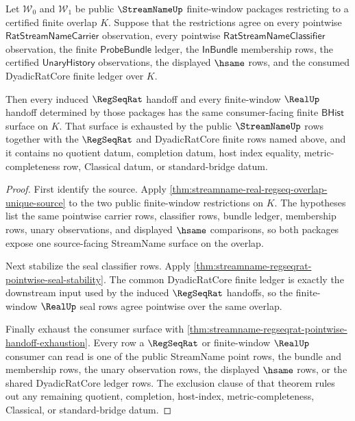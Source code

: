 \begin{theorem}
\label{thm:streamname-real-regseq-common-window-consumer-determinacy}
Let $\mathcal{W}_0$ and $\mathcal{W}_1$ be public $\StreamNameUp$
finite-window packages restricting to a certified finite overlap $K$. Suppose
that the restrictions agree on every pointwise $\mathsf{RatStreamNameCarrier}$
observation, every pointwise $\mathsf{RatStreamNameClassifier}$ observation,
the finite $\mathsf{ProbeBundle}$ ledger, the $\mathsf{InBundle}$ membership
rows, the certified $\mathsf{UnaryHistory}$ observations, the displayed
$\hsame$ rows, and the consumed DyadicRatCore finite ledger over $K$.

Then every induced $\RegSeqRat$ handoff and every finite-window $\RealUp$
handoff determined by those packages has the same consumer-facing finite
$\mathsf{BHist}$ surface on $K$. That surface is exhausted by the public
$\StreamNameUp$ rows together with the $\RegSeqRat$ and DyadicRatCore finite
rows named above, and it contains no quotient datum, completion datum, host
index equality, metric-completeness row, Classical datum, or standard-bridge
datum.
\end{theorem}
\begin{proof}
First identify the source. Apply
\autoref{thm:streamname-real-regseq-overlap-unique-source} to the two public
finite-window restrictions on $K$. The hypotheses list the same pointwise
carrier rows, classifier rows, bundle ledger, membership rows, unary
observations, and displayed $\hsame$ comparisons, so both packages expose one
source-facing StreamName surface on the overlap.

Next stabilize the seal classifier rows. Apply
\autoref{thm:streamname-regseqrat-pointwise-seal-stability}. The common
DyadicRatCore finite ledger is exactly the downstream input used by the
induced $\RegSeqRat$ handoffs, so the finite-window $\RealUp$ seal rows agree
pointwise over the same overlap.

Finally exhaust the consumer surface with
\autoref{thm:streamname-regseqrat-pointwise-handoff-exhaustion}. Every row a
$\RegSeqRat$ or finite-window $\RealUp$ consumer can read is one of the public
StreamName point rows, the bundle and membership rows, the unary observation
rows, the displayed $\hsame$ rows, or the shared DyadicRatCore ledger rows.
The exclusion clause of that theorem rules out any remaining quotient,
completion, host-index, metric-completeness, Classical, or standard-bridge
datum.
\end{proof}

